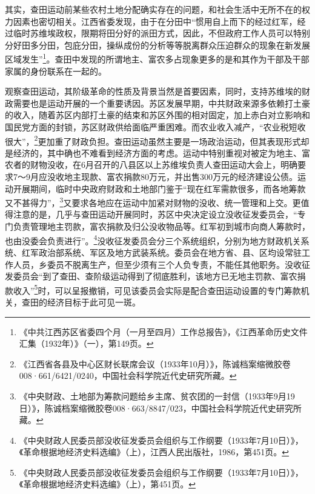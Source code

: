 其实，查田运动前某些农村土地分配确实存在的问题，和社会生活中无所不在的权力因素也密切相关。江西省委发现，由于在分田中“惯用自上而下的经过红军，经过临时苏维埃政权，限期将田分好的派田方式，因此，不但政府工作人员可以特别分好田多分田，包庇分田，操纵成份的分析等等脱离群众压迫群众的现象在新发展区域发生”\footnote{《中共江西苏区省委四个月（一月至四月）工作总报告》，《江西革命历史文件汇集（1932年）》（一），第149页。}。查田中发现的所谓地主、富农多占现象更多的是和其作为干部及干部家属的身份联系在一起的。


观察查田运动，其阶级革命的性质及背景当然是首要因素，同时，支持苏维埃的财政需要也是运动开展的一个重要诱因。苏区发展早期，中共财政来源多依赖打土豪的收入，随着苏区内部打土豪的结束和苏区外围的相对固定，加上赤白对立影响和国民党方面的封锁，苏区财政供给面临严重困难。而农业收入减产，“农业税短收很大”，\footnote{《江西省各县及中心区财长联席会议（1933年10月）》，陈诚档案缩微胶卷008·661/6421/0240，中国社会科学院近代史研究所藏。}更加重了财政负担。查田运动虽然主要是一场政治运动，但其表现形式却是经济的，其中确也不难看到经济方面的考虑。运动中特别重视对被定为地主、富农者的财物没收，在6月召开的八县区以上苏维埃负责人查田运动大会上，明确要求7～9月应没收地主现款、富农捐款80万元，并出售300万元的经济建设公债。运动开展期间，临时中央政府财政和土地部门鉴于“现在红军需款很多，而各地筹款又不甚得力”，\footnote{《中央财政、土地部为筹款问题给乡主席、贫农团的一封信（1933年9月19日）》，陈诚档案缩微胶卷008·663/8847/023，中国社会科学院近代史研究所藏。}又要求各地应在运动中加紧对财物的没收、统一管理和上交。更值得注意的是，几乎与查田运动开展同时，苏区中央决定设立没收征发委员会，“专门负责管理地主罚款，富农捐款及归公没收物品等。红军初到城市向商人筹款时，也由没委会负责进行”。\footnote{《中央财政人民委员部没收征发委员会组织与工作纲要（1933年7月10日）》，《革命根据地经济史料选编》（上），江西人民出版社，1986，第451页。}没收征发委员会分三个系统组织，分别为地方财政机关系统、红军政治部系统、军区及地方武装系统。委员会在地方省、县、区均设常驻工作人员，乡委员不脱离生产，但至少须有三个人负专责，不能任其他职务。没收征发委员会“到了查田、查阶级运动得到了彻底胜利，该地方已无地主罚款、富农捐款收入”\footnote{《中央财政人民委员部没收征发委员会组织与工作纲要（1933年7月10日）》，《革命根据地经济史料选编》（上），第451页。}时，可以呈报撤销，可见该委员会实际是配合查田运动设置的专门筹款机关，查田的经济目标于此可见一斑。


